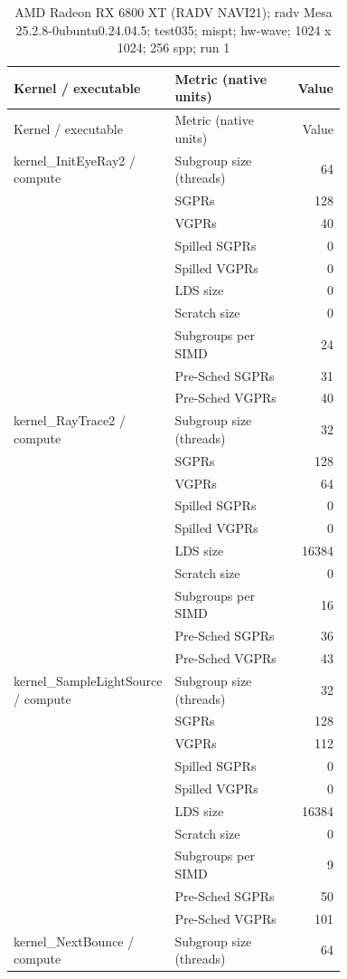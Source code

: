 \begin{longtable}{p{0.30\linewidth}p{0.43\linewidth}r}
\caption{AMD Radeon RX 6800 XT (RADV NAVI21); radv Mesa 25.2.8-0ubuntu0.24.04.5; test035; mispt; hw-wave; 1024 x 1024; 256 spp; run 1}\label{tab:hydra-profile-22}\\
\hline Kernel / executable & Metric (native units) & Value \\\hline
\endfirsthead
\hline Kernel / executable & Metric (native units) & Value \\\hline
\endhead
kernel\_InitEyeRay2 / compute & Subgroup size (threads) & 64 \\
 & SGPRs & 128 \\
 & VGPRs & 40 \\
 & Spilled SGPRs & 0 \\
 & Spilled VGPRs & 0 \\
 & LDS size & 0 \\
 & Scratch size & 0 \\
 & Subgroups per SIMD & 24 \\
 & Pre-Sched SGPRs & 31 \\
 & Pre-Sched VGPRs & 40 \\
\hline
kernel\_RayTrace2 / compute & Subgroup size (threads) & 32 \\
 & SGPRs & 128 \\
 & VGPRs & 64 \\
 & Spilled SGPRs & 0 \\
 & Spilled VGPRs & 0 \\
 & LDS size & 16384 \\
 & Scratch size & 0 \\
 & Subgroups per SIMD & 16 \\
 & Pre-Sched SGPRs & 36 \\
 & Pre-Sched VGPRs & 43 \\
\hline
kernel\_SampleLightSource / compute & Subgroup size (threads) & 32 \\
 & SGPRs & 128 \\
 & VGPRs & 112 \\
 & Spilled SGPRs & 0 \\
 & Spilled VGPRs & 0 \\
 & LDS size & 16384 \\
 & Scratch size & 0 \\
 & Subgroups per SIMD & 9 \\
 & Pre-Sched SGPRs & 50 \\
 & Pre-Sched VGPRs & 101 \\
\hline
kernel\_NextBounce / compute & Subgroup size (threads) & 64 \\

\end{longtable}
